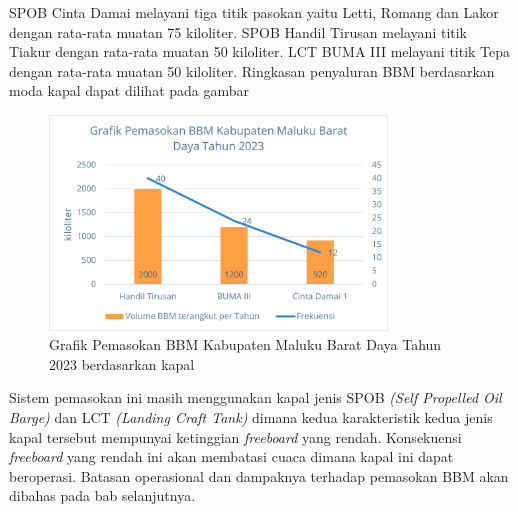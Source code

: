     SPOB Cinta Damai melayani tiga titik pasokan yaitu Letti, Romang dan Lakor dengan rata-rata muatan 75 kiloliter. SPOB Handil Tirusan melayani titik Tiakur dengan rata-rata muatan 50 kiloliter. LCT BUMA III melayani titik Tepa dengan rata-rata muatan 50 kiloliter. Ringkasan penyaluran BBM berdasarkan moda kapal dapat dilihat pada gambar 

\begin{figure}[htbp!]
    \centering
    \includegraphics[width=0.8\textwidth]{gambar/pemasokan-BBM-MBD.png}
    \caption{Grafik Pemasokan BBM Kabupaten Maluku Barat Daya Tahun 2023 berdasarkan kapal}
    \label{fig:kapal-mbd-old}
\end{figure}

Sistem pemasokan ini masih menggunakan kapal jenis SPOB \emph{(Self Propelled Oil Barge)} dan LCT \emph{(Landing Craft Tank)} dimana kedua karakteristik kedua jenis kapal tersebut mempunyai ketinggian \emph{freeboard} yang rendah. Konsekuensi \emph{freeboard} yang rendah ini akan membatasi cuaca dimana kapal ini dapat beroperasi. Batasan operasional dan dampaknya terhadap pemasokan BBM akan dibahas pada bab selanjutnya.
